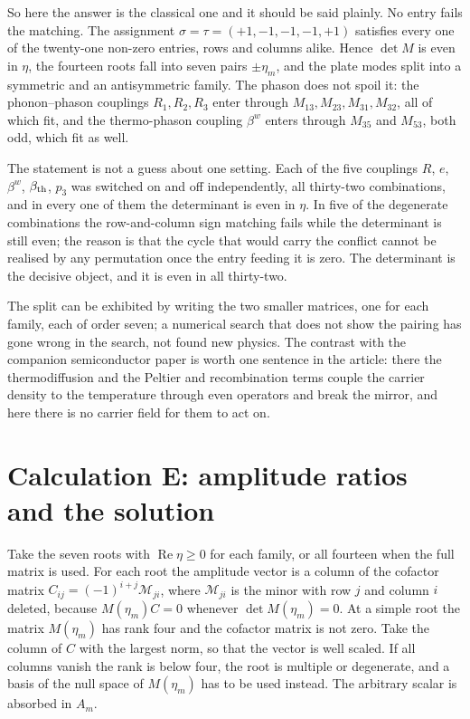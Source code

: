 \documentclass[11pt]{article}
\makeatletter
\newif\ifshowworked
\newenvironment{worked}{%
  \ifshowworked\par\smallskip\noindent\textit{Working.}\par\smallskip\else
  \setbox\z@\vbox\bgroup\fi}{\ifshowworked\par\smallskip\else\egroup\fi}
\makeatother
\begin{document}
So here the answer is the classical one and it should be said plainly. No entry fails the
matching. The assignment $\sigma=\tau=(+1,-1,-1,-1,+1)$ satisfies every one of the twenty-one non-zero
entries, rows and columns alike. Hence $\det M$ is even in $\eta$, the fourteen roots fall into seven
pairs $\pm\eta_m$, and the plate modes split into a symmetric and an antisymmetric family. The phason does
not spoil it: the phonon--phason couplings $R_1,R_2,R_3$ enter through $M_{13},M_{23},M_{31},M_{32}$, all
of which fit, and the thermo-phason coupling $\beta^{w}$ enters through $M_{35}$ and $M_{53}$, both odd,
which fit as well.

The statement is not a guess about one setting. Each of the five couplings $R$, $e$, $\beta^{w}$,
$\beta_{\rm th}$, $p_3$ was switched on and off independently, all thirty-two combinations, and in every
one of them the determinant is even in $\eta$. In five of the degenerate combinations the row-and-column
sign matching fails while the determinant is still even; the reason is that the cycle that would carry the
conflict cannot be realised by any permutation once the entry feeding it is zero. The determinant is the
decisive object, and it is even in all thirty-two.

The split can be exhibited by writing the two smaller matrices, one for each family, each of order seven;
a numerical search that does not show the pairing has gone wrong in the search, not found new physics. The
contrast with the companion semiconductor paper is worth one sentence in the article: there the
thermodiffusion and the Peltier and recombination terms couple the carrier density to the temperature
through even operators and break the mirror, and here there is no carrier field for them to act on.

\section{Calculation E: amplitude ratios and the solution}\label{sec:calcE}

\begin{worked}
Take the seven roots with $\operatorname{Re}\eta\ge0$ for each family, or all fourteen when the full matrix
is used. For each root the amplitude vector is a column of the cofactor matrix
$C_{ij}=(-1)^{i+j}\mathcal M_{ji}$, where $\mathcal M_{ji}$ is the minor with row $j$ and column $i$
deleted, because $M(\eta_m)C=0$ whenever $\det M(\eta_m)=0$.
At a simple root the matrix $M(\eta_m)$ has rank four and the cofactor matrix is not zero. Take the column of $C$
with the largest norm, so that the vector is well scaled. If all columns vanish the rank is below four, the root is
multiple or degenerate, and a basis of the null space of $M(\eta_m)$ has to be used instead. The arbitrary scalar is
absorbed in $A_m$.
\end{worked}
\end{document}
